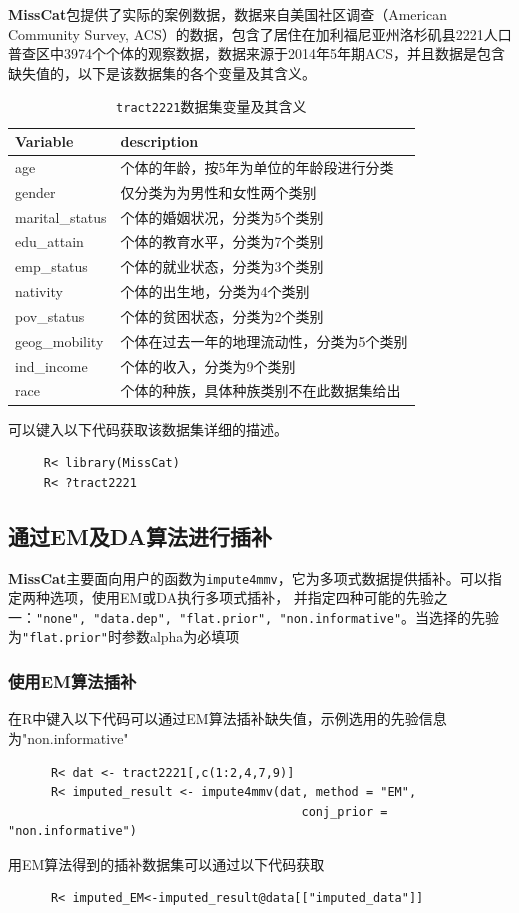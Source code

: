 \documentclass[12pt,hyperref,a4paper,UTF8]{ctexart}
\begin{document}
  \textbf{MissCat}包提供了实际的案例数据，数据来自美国社区调查（American Community Survey, ACS）的数据，包含了居住在加利福尼亚州洛杉矶县2221人口普查区中3974个个体的观察数据，数据来源于2014年5年期ACS，并且数据是包含缺失值的，以下是该数据集的各个变量及其含义。
  
  \begin{table}[H]
    \centering
    \caption{\texttt{tract2221}数据集变量及其含义}
    \begin{tabular}{ll}
        \toprule
        Variable&description \\ \midrule
        age & 个体的年龄，按5年为单位的年龄段进行分类 \\
        gender&仅分类为为男性和女性两个类别 \\
        marital\_status&个体的婚姻状况，分类为5个类别\\
        edu\_attain&个体的教育水平，分类为7个类别\\
        emp\_status&个体的就业状态，分类为3个类别\\
        nativity&个体的出生地，分类为4个类别\\
        pov\_status&个体的贫困状态，分类为2个类别\\
        geog\_mobility&个体在过去一年的地理流动性，分类为5个类别\\
        ind\_income&个体的收入，分类为9个类别\\
        race&个体的种族，具体种族类别不在此数据集给出\\\bottomrule
    \end{tabular}
  \end{table}
可以键入以下代码获取该数据集详细的描述。
  \begin{verbatim}
     R< library(MissCat)
     R< ?tract2221
  \end{verbatim}

  \subsection{通过EM及DA算法进行插补}
    \textbf{MissCat}主要面向用户的函数为\texttt{impute4mmv}，它为多项式数据提供插补。可以指定两种选项，使用EM或DA执行多项式插补，
  并指定四种可能的先验之一：\texttt{"none", "data.dep", "flat.prior", "non.informative"}。当选择的先验为\texttt{"flat.prior"}时参数alpha为必填项
  \subsubsection{使用EM算法插补}
  在R中键入以下代码可以通过EM算法插补缺失值，示例选用的先验信息为"non.informative"
  \begin{verbatim}
      R< dat <- tract2221[,c(1:2,4,7,9)]
      R< imputed_result <- impute4mmv(dat, method = "EM",
                                         conj_prior = "non.informative")
  \end{verbatim}
  用EM算法得到的插补数据集可以通过以下代码获取
  \begin{verbatim}
      R< imputed_EM<-imputed_result@data[["imputed_data"]]
  \end{verbatim}
\end{document}
